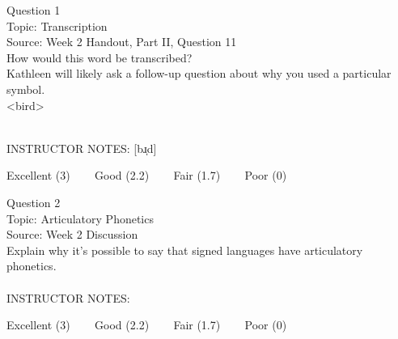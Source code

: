 \documentclass[12pt]{article}
\begin{document}
\begin{center}
\textbf{{\color{violet}{\HUGE 20210604 Friday\\}}}

\textbf{{\color{violet}{\HUGE ALL EXAMS (with notes)\\}}}

\end{center}
\newpage

\begin{center}
\textbf{{\color{blue}{\HUGE START OF EXAM\\}}}

\textbf{{\color{blue}{\HUGE Student ID: 16464\\}}}

\textbf{{\color{blue}{\HUGE 3:00\\}}}

\end{center}
\newpage

{\large Question 1}\\

Topic: Transcription\\
Source: Week 2 Handout, Part II, Question 11\\

How would this word be transcribed?\\ Kathleen will likely ask a follow-up question about why you used a particular symbol.\\

<bird>


~\\
INSTRUCTOR NOTES: [bɹ̩d]


\vfill
Excellent (3) ~~~ Good (2.2) ~~~ Fair (1.7) ~~~ Poor (0)
\newpage

{\large Question 2}\\

Topic: Articulatory Phonetics\\
Source: Week 2 Discussion\\

Explain why it's possible to say that signed languages have articulatory phonetics.\\


~\\
INSTRUCTOR NOTES: 


\vfill
Excellent (3) ~~~ Good (2.2) ~~~ Fair (1.7) ~~~ Poor (0)
\newpage

\begin{center}
\textbf{{\color{red}{\HUGE END OF EXAM}}}\\

\end{center}
\newpage
\end{document}
